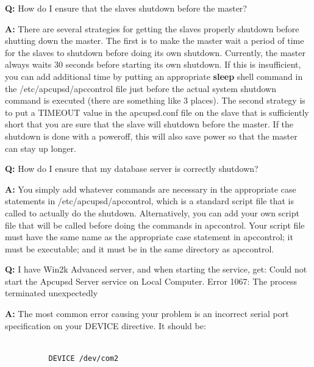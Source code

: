 {{{{{{{{{\begin{description}
{{{\item {\bf Q:}
How do I ensure that the slaves shutdown before the master?  

\item {\bf A:}
There are several strategies for getting the slaves properly shutdown before
shutting down the master. The first is to make the master wait a period of
time for the slaves to shutdown before doing its own shutdown. Currently, the
master always waits 30 seconds before starting its own shutdown. If this is
insufficient, you can add additional time by putting an appropriate {\bf
sleep} shell command in the /etc/apcupsd/apccontrol file just before the
actual system shutdown command is executed (there are something like 3
places). The second strategy is to put a TIMEOUT value in the apcupsd.conf
file on the slave that is sufficiently short that you are sure that the slave
will shutdown before the master. If the shutdown is done with a poweroff, this
will also save power so that the master can stay up longer.  

\item {\bf Q:}
How do I ensure that my database server is correctly shutdown?  

\item {\bf A:}
You simply add whatever commands are necessary in the appropriate case
statements in /etc/apcupsd/apccontrol, which is a standard script file that is
called to actually do the shutdown. Alternatively, you can add your own script
file that will be called before doing the commands in apccontrol. Your script
file must have the same name as the appropriate case statement in apccontrol;
it must be executable; and it must be in the same directory as apccontrol.  

\item {\bf Q:}
I have Win2k Advanced server, and when starting the service, get: Could not
start the Apcupsd Server service on Local Computer. Error 1067: The process
terminated unexpectedly  

\item {\bf A:}
The most common error causing your problem is an incorrect serial port
specification on your DEVICE directive. It should be:  

\footnotesize
\begin{verbatim}
          
          DEVICE /dev/com2
     
\end{verbatim}
\normalsize

}}}
\end{description}}}}}}}}}}
